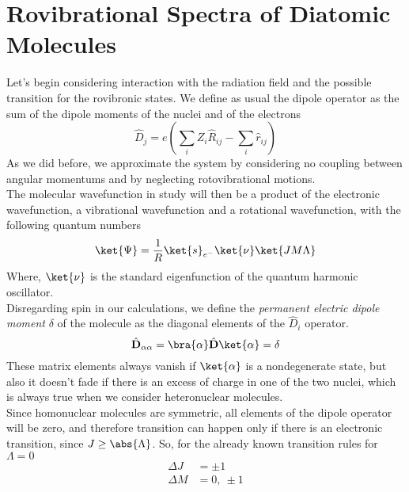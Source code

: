 \documentclass[a4paper, 11pt]{book}
\renewcommand{\vec}[1]{\mathbf{#1}}
\newcommand{\1}{\opr{\mathds{1}}}
\newcommand{\opr}[1]{\hat{#1}}
\newcommand{\vecopr}[1]{\opr{\vec{#1}}}
\theoremstyle{plain}
\begin{document}
	\section{Rovibrational Spectra of Diatomic Molecules}
	Let's begin considering interaction with the radiation field and the possible transition for the rovibronic states. We define as usual the dipole operator as the sum of the dipole moments of the nuclei and of the electrons
	\begin{equation}
		\opr{D}_j=e\left( \sum_iZ_i\opr{R}_{ij}-\sum_i\opr{r}_{ij} \right)
		\label{eq:dipolemomentmolecule}
	\end{equation}
	As we did before, we approximate the system by considering no coupling between angular momentums and by neglecting rotovibrational motions.\\
	The molecular wavefunction in study will then be a product of the electronic wavefunction, a vibrational wavefunction and a rotational wavefunction, with the following quantum numbers
	\begin{equation}
		\ket{\Psi}=\frac{1}{R}\ket{s}_{e^-}\ket{\nu}\ket{JM\Lambda}
		\label{eq:molecularwavefunctionvibrations}
	\end{equation}
	Where, $\ket{\nu}$ is the standard eigenfunction of the quantum harmonic oscillator.\\
	Disregarding spin in our calculations, we define the \textit{permanent electric dipole moment} $\delta$ of the molecule as the diagonal elements of the $\opr{D}_i$ operator.\\
	\begin{equation*}
		\vecopr{D}_{\alpha\alpha}=\bra{\alpha}\vecopr{D}\ket{\alpha}=\vec{\delta}
	\end{equation*}
	These matrix elements always vanish if $\ket{\alpha}$ is a nondegenerate state, but also it doesn't fade if there is an excess of charge in one of the two nuclei, which is always true when we consider heteronuclear molecules.\\
	Since homonuclear molecules are symmetric, all elements of the dipole operator will be zero, and therefore transition can happen only if there is an electronic transition, since $J\ge\abs{\Lambda}$. So, for the already known transition rules for $\Lambda=0$
	\begin{equation*}
		\begin{aligned}
			\Delta J&=\pm1\\
			\Delta M&= 0,\ \pm1
		\end{aligned}
	\end{equation*}
\end{document}
